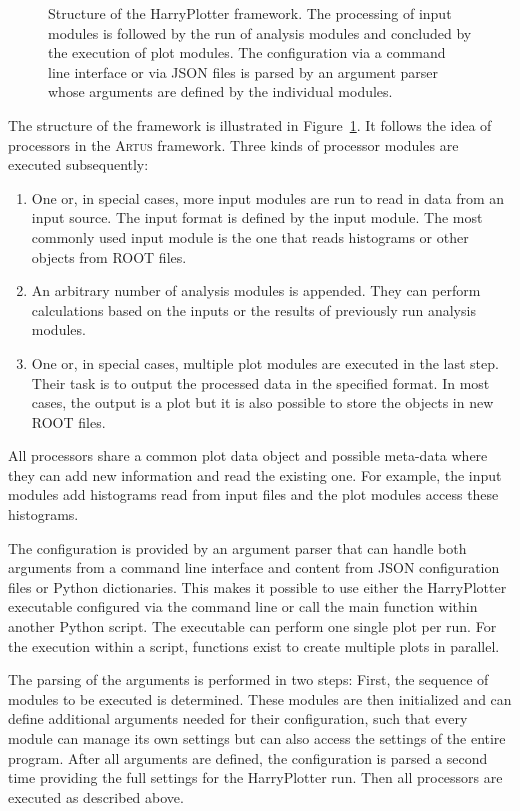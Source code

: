 \documentclass[3p]{elsarticle}
\newcommand{\software}[1]{\textsc{#1}\xspace}
\newcommand{\artus}{\software{Artus}}
\begin{document}
\begin{figure}[htb]
\centering 
\caption{Structure of the HarryPlotter framework.
The processing of input modules is followed by the run of analysis modules and concluded by the execution of plot modules.
The configuration via a command line interface or via JSON files is parsed by an argument parser whose arguments are defined by the individual modules.}
\label{figure_artus_harry_plotter}
\end{figure}

The structure of the framework is illustrated in Figure~\ref{figure_artus_harry_plotter}.
It follows the idea of processors in the \artus framework.
Three kinds of processor modules are executed subsequently:
\begin{enumerate}
\item One or, in special cases, more input modules are run to read in data from an input source.
The input format is defined by the input module.
The most commonly used input module is the one that reads histograms or other objects from ROOT files.
\item An arbitrary number of analysis modules is appended.
They can perform calculations based on the inputs or the results of previously run analysis modules.
\item One or, in special cases, multiple plot modules are executed in the last step.
Their task is to output the processed data in the specified format.
In most cases, the output is a plot but it is also possible to store the objects in new ROOT files.
\end{enumerate}
All processors share a common plot data object and possible meta-data where they can add new information and read the existing one.
For example, the input modules add histograms read from input files and the plot modules access these histograms.

The configuration is provided by an argument parser that can handle both arguments from a command line interface and content from JSON configuration files or Python dictionaries.
This makes it possible to use either the HarryPlotter executable configured via the command line or call the main function within another Python script.
The executable can perform one single plot per run.
For the execution within a script, functions exist to create multiple plots in parallel.

The parsing of the arguments is performed in two steps:
First, the sequence of modules to be executed is determined.
These modules are then initialized and can define additional arguments needed for their configuration, such that every module can manage its own settings but can also access the settings of the entire program.
After all arguments are defined, the configuration is parsed a second time providing the full settings for the HarryPlotter run.
Then all processors are executed as described above.
\end{document}
